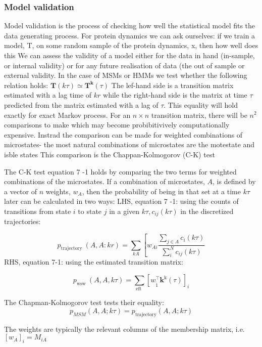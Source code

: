 \subsubsection{Model validation}\label{sec:model_validation}

Model validation is the process of checking how well the statistical model fits the data generating process. For protein dynamics we can ask ourselves: if we train a model, T, on some random sample of the protein dynamics, x, then how well does this We can assess the validity of a model either for the data in hand (in-sample, or internal validity) or for any future realisation of data (the out of sample or external validity. In the case of MSMs or HMMs we test whether the following relation holds:
$\mathbf{T}(k \tau) \simeq \mathbf{T}^{\mathbf{k}}(\tau)$
The lef-hand side is a transition matrix estimated with a lag time of $k r$ while the right-hand side is the matrix at time $\tau$ predicted from the matrix estimated with a lag of $\tau$. This equality will hold exactly for exact Markov process. For an $n \times n$ transition matrix, there will be $n^{2}$ comparisons to make which may become probibitivively computationally expensive. Instrad the comparison can be made for weighted combinations of microstates- the most natural combinations of microstates are the motestate and isble states This comparison is the Chappan-Kolmogorov (C-K) test

The C-K test equation 7 -1 holds by comparing the two terms for weighted combinations of the microstates. If a combination of microstates, $A$, is defined by a vector of $n$ weights, $w_{A}$, then the probability of being in that set at a time $k \tau$ later can be calculated in two ways:
LHS, equation 7 -1: using the counts of transitions from state $i$ to state $j$ in a given $k \tau, c_{i j}(k \tau)$ in the discretized trajectories:

\begin{equation}
p_{\text {trajectory }}(A, A: k r)=\sum_{k A}\left[w_{A i} \frac{\sum_{j \in A} c_{i}(k \tau)}{\sum_{i}^{N} c_{i j}(k \tau)}\right.
\end{equation}
RHS, equation 7-1: using the estimated transition matrix:

\begin{equation}
p_{\text {wsw }}(A, A, k \tau)=\sum_{\text {eft }}\left[w_{\tilde{1}}^{\top} \mathbf{k}^{\mathrm{k}}(\tau)\right]_{i}
\end{equation}

The Chapman-Kolmogorov test tests their equality:
\begin{equation}\label{eqn:ck_test}
p_{M S M}(A, A ; k \tau)=p_{\text {trajectory}}(A, A ; k \tau)
\end{equation}

The weights are typically the relevant columns of the membership matrix, i.e. $\left[w_{A}\right]_{i}=M_{i A}$

